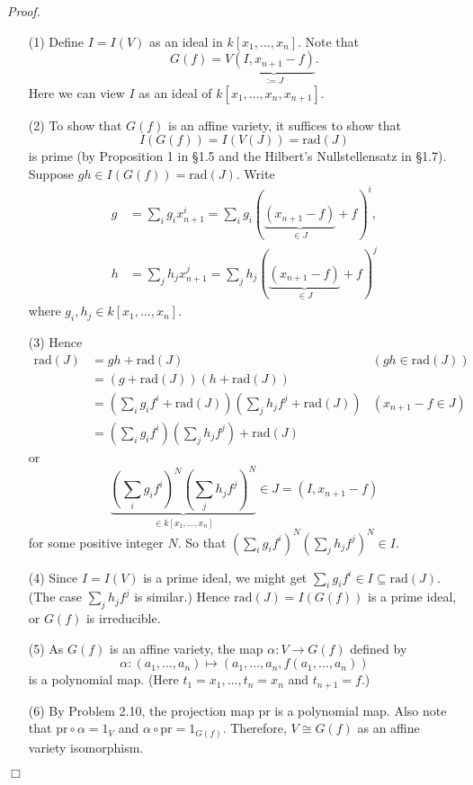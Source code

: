 \documentclass{article}
\begin{document}
\emph{Proof.}
\begin{enumerate}
\item[(1)]
  Define $I = I(V)$ as an ideal in $k[x_1,\ldots,x_n]$.
  Note that
  \[
    G(f) = V\underbrace{(I, x_{n+1} - f)}_{:= J}.
  \]
  Here we can view $I$ as an ideal of $k[x_1,\ldots,x_n,x_{n+1}]$.

\item[(2)]
  To show that $G(f)$ is an affine variety, it suffices to show that
  \[
    I(G(f)) = I(V(J)) = \mathrm{rad}(J)
  \]
  is prime (by Proposition 1 in \S 1.5 and the Hilbert's Nullstellensatz in \S 1.7).
  Suppose $gh \in I(G(f)) = \mathrm{rad}(J)$. Write
  \begin{align*}
    g
    &= \sum_{i} g_i x_{n+1}^i
    = \sum_{i} g_i (\underbrace{(x_{n+1} - f)}_{\in J} + f)^i, \\
    h
    &= \sum_{j} h_j x_{n+1}^j
    = \sum_{j} h_j (\underbrace{(x_{n+1} - f)}_{\in J} + f)^j
  \end{align*}
  where $g_i, h_j \in k[x_1,\ldots,x_n]$.

\item[(3)]
  Hence
  \begin{align*}
    \mathrm{rad}(J)
    &= gh + \mathrm{rad}(J)
      &(gh \in \mathrm{rad}(J)) \\
    &= (g + \mathrm{rad}(J))(h + \mathrm{rad}(J)) \\
    &= \left( \sum_{i} g_i f^i + \mathrm{rad}(J) \right)
      \left( \sum_{j} h_j f^j + \mathrm{rad}(J) \right)
      &(x_{n+1} - f \in J) \\
    &= \left( \sum_{i} g_i f^i \right)
      \left( \sum_{j} h_j f^j \right) + \mathrm{rad}(J)
  \end{align*}
  or
  \[
    \underbrace{\left( \sum_{i} g_i f^i \right)^N
      \left( \sum_{j} h_j f^j \right)^N}_{\in k[x_1,\ldots,x_n]}
    \in J = (I, x_{n+1} - f)
  \]
  for some positive integer $N$.
  So that $\left( \sum_{i} g_i f^i \right)^N \left( \sum_{j} h_j f^j \right)^N \in I$.

\item[(4)]
  Since $I = I(V)$ is a prime ideal,
  we might get $\sum_{i} g_i f^i \in I \subseteq \mathrm{rad}(J)$.
  (The case $\sum_{j} h_j f^j$ is similar.)
  Hence $\mathrm{rad}(J) = I(G(f))$ is a prime ideal, or $G(f)$ is irreducible.

\item[(5)]
  As $G(f)$ is an affine variety,
  the map $\alpha: V \to G(f)$ defined by
  \[
    \alpha: (a_1,\ldots,a_n) \mapsto (a_1,\ldots,a_n,f(a_1,\ldots,a_n))
  \]
  is a polynomial map. (Here $t_1 = x_1, \ldots, t_n = x_n$ and $t_{n+1} = f$.)

\item[(6)]
  By Problem 2.10, the projection map $\mathrm{pr}$ is a polynomial map.
  Also note that $\mathrm{pr} \circ \alpha = 1_{V}$
  and $\alpha \circ \mathrm{pr} = 1_{G(f)}$.
  Therefore, $V \cong G(f)$ as an affine variety isomorphism.
\end{enumerate}
$\Box$ \\\\
\end{document}
